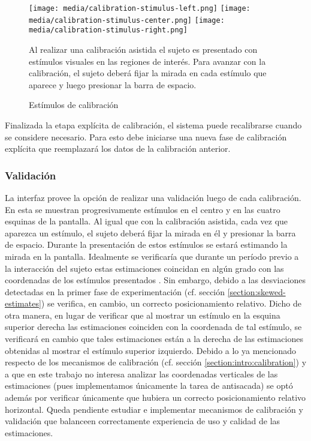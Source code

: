 \begin{figure}
    \centering
    \texttt{[image: media/calibration-stimulus-left.png]}
    \texttt{[image: media/calibration-stimulus-center.png]}
    \texttt{[image: media/calibration-stimulus-right.png]}
    \caption{Estímulos de calibración}
    Al realizar una calibración asistida el sujeto es presentado con estímulos
    visuales en las regiones de interés.
    Para avanzar con la calibración, el sujeto deberá fijar la mirada en cada
    estímulo que aparece y luego presionar la barra de espacio.
    \label{fig:calibration_stimulus}
\end{figure}

Finalizada la etapa explícita de calibración, el sistema puede recalibrarse
cuando se considere necesario.
Para esto debe iniciarse una nueva fase de calibración explícita que
reemplazará los datos de la calibración anterior.

\subsubsection{Validación}

La interfaz \jspsych provee la opción de realizar una validación luego de cada
calibración.
En esta se muestran progresivamente estímulos en el centro y en las cuatro
esquinas de la pantalla.
Al igual que con la calibración asistida, cada vez que aparezca un estímulo, el
sujeto deberá fijar la mirada en él y presionar la barra de espacio.
Durante la presentación de estos estímulos se estará estimando la mirada en la
pantalla.
Idealmente se verificaría que durante un período previo a la interacción del
sujeto estas estimaciones coincidan en algún grado con las coordenadas de los
estímulos presentados \cite{huang_2016_pace}.
Sin embargo, debido a las desviaciones detectadas en la primer fase de
experimentación (cf. sección \ref{section:skewed-estimates}) se
verifica, en cambio, un correcto posicionamiento relativo.
Dicho de otra manera, en lugar de verificar que al mostrar un estímulo en la
esquina superior derecha las estimaciones coinciden con la coordenada de tal
estímulo, se verificará en cambio que tales estimaciones están a la derecha de
las estimaciones obtenidas al mostrar el estímulo superior izquierdo.
Debido a lo ya mencionado respecto de los mecanismos de calibración (cf.
sección \ref{section:intro:calibration}) y a que en este trabajo no interesa
analizar las coordenadas verticales de las estimaciones (pues implementamos
únicamente la tarea de antisacada) se optó además por verificar únicamente que
hubiera un correcto posicionamiento relativo horizontal.
Queda pendiente estudiar e implementar mecanismos de calibración y validación
que balanceen correctamente experiencia de uso y calidad de las estimaciones.

